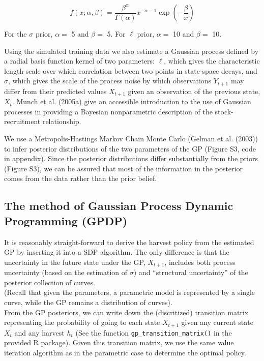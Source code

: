 \documentclass[author-year, 12pt,review]{components/elsarticle} %
\begin{document}
\[f(x; \alpha, \beta) = \frac{\beta^\alpha}{\Gamma(\alpha)} x^{-\alpha - 1}\exp\left(-\frac{\beta}{x}\right)\]

For the $\sigma$ prior, $\alpha = $ 5 and $\beta = $ 5. For $\ell$
prior, $\alpha = $ 10 and $\beta = $ 10.

Using the simulated training data we also estimate a Gaussian process
defined by a radial basis function kernel of two parameters: $\ell$,
which gives the characteristic length-scale over which correlation
between two points in state-space decays, and $\sigma$, which gives the
scale of the process noise by which observations $Y_{t+1}$ may differ
from their predicted values $X_{t+1}$ given an observation of the
previous state, $X_t$. Munch et al. (2005a) give an accessible
introduction to the use of Gaussian processes in providing a Bayesian
nonparametric description of the stock-recruitment relationship.

We use a Metropolis-Hastings Markov Chain Monte Carlo (Gelman et al.
(2003)) to infer posterior distributions of the two parameters of the GP
(Figure S3, code in appendix). Since the posterior distributions differ
substantially from the priors (Figure S3), we can be assured that most
of the information in the posterior comes from the data rather than the
prior belief.

\subsection{The method of Gaussian Process Dynamic Programming
(GPDP)}\label{the-method-of-gaussian-process-dynamic-programming-gpdp}

It is reasonably straight-forward to derive the harvest policy from the
estimated GP by inserting it into a SDP algorithm. The only difference
is that the uncertainty in the future state under the GP, $X_{t+1}$,
includes both process uncertainty (based on the estimation of $\sigma$)
and ``structural uncertainty'' of the posterior collection of
curves.\\(Recall that given the parameters, a parametric model is
represented by a single curve, while the GP remains a distribution of
curves).\\From the GP posteriors, we can write down the (discritized)
transition matrix representing the probability of going to each state
$X_{t+1}$ given any current state $X_t$ and any harvest $h_t$ (See the
function \texttt{gp\_transition\_matrix()} in the provided R package).
Given this transition matrix, we use the same value iteration algorithm
as in the parametric case to determine the optimal policy.
\end{document}

